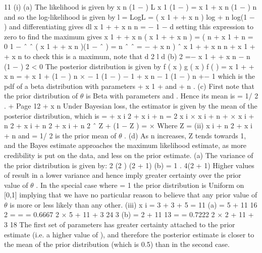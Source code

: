 \documentclass[a4paper,12pt]{article}
\begin{document}
11
(i)
(a)
The likelihood is given by
\theta  x n (1 − \theta  )
L \propto \theta  x 1 (1 − \theta  )
= \theta  x 1 +
x n
(1 − \theta  ) n
and so the log-likelihood is given by
l = LogL = ( x 1 +
+ x n ) log \theta  + n log(1 − \theta  )
and differentiating gives
dl x 1 + + x n
n
=
−
1 − \theta 
d \theta 
\theta 
setting this expression to zero to find the maximum gives
x 1 + + x n
( x 1 + + x n ) = ( n + x 1 +
n
= 0
1 − \theta  ˆ
\theta  ˆ
( x 1 + + x n )(1 − \theta  ˆ ) = n \theta  ˆ
\theta  ˆ =
−
+ x n ) \theta  ˆ
x 1 + + x n
n + x 1 + + x n
to check this is a maximum, note that
d 2 l
d \theta 
(b)
2
=−
x 1 +
+ x n
−
n
(1 − \theta  ) 2
< 0
The posterior distribution is given by
f ( \theta  x ) \propto g ( x \theta  ) f ( \theta  )
= \theta  x 1 +
+ x n
= \theta  \alpha + x 1 +
(1 − \theta  ) n × \theta  \alpha − 1 (1 − \theta  ) \alpha − 1
+ x n − 1
(1 − \theta  ) n +\alpha − 1
which is the pdf of a beta distribution with parameters \alpha  + x 1 +
and \alpha  + n .
(c)
First note that the prior distribution of $\theta$   is Beta with parameters \alpha 
and \alpha  . Hence its mean is
\alpha 
= 1/ 2 .
\alpha +\alpha 
Page 12
+ x n
Under Bayesian loss, the estimator is given by the mean of the posterior distribution, which is
\theta  * =
\alpha  + \sum  x i
2 \alpha  + \sum  x i + n
=
2 
\sum  x i × \sum  x i + n +
×
\sum  x i + n 2 \alpha  + \sum  x i + n 2 \alpha  + \sum  x i + n 2
ˆ Z + (1 − Z ) \mu 
= \theta ×
Where Z =
(ii)
\sum  x i + n
2 \alpha  + \sum  x i + n
and \mu  = 1/ 2 is the prior mean of $\theta$  .
(d) As n increases, Z tends towards 1, and the Bayes estimate approaches the maximum likelihood estimate, as more credibility is put on the data, and less on the prior estimate.
(a) The variance of the prior distribution is given by:
2
(2 \alpha  ) (2 \alpha  + 1)
(b)
=
1
.
4(2 \alpha  + 1)
Higher values of \alpha  result in a lower variance and hence imply greater certainty over the prior value of $\theta$   .
In the special case where \alpha  = 1 the prior distribution is Uniform on [0,1] implying that we have no particular reason to believe that any prior value of $\theta$  is more or less likely than any other.
(iii)
\sum  x i = 3 + 3 + 5 = 11
(a) \theta  * = 5 + 11
16 2
=
= = 0.6667
2 × 5 + 11 + 3 24 3
(b) \theta  * = 2 + 11
13
= = 0.7222
2 × 2 + 11 + 3 18
The first set of parameters has greater certainty attached to the prior estimate (i.e. a higher value of \alpha  ), and therefore the posterior estimate is closer to the mean of the prior distribution (which is 0.5) than in the second case.
\end{document}
